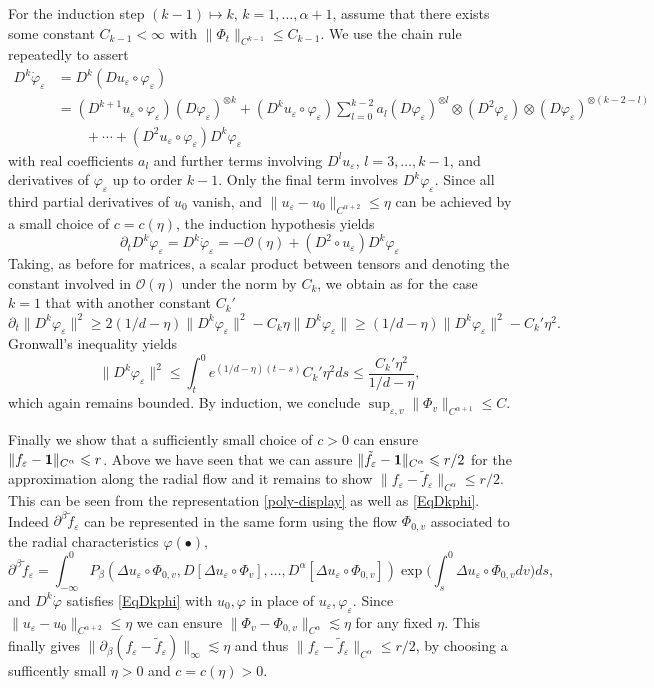 \documentclass{article}
\numberwithin{equation}{section}
\theoremstyle{definition}
\providecommand{\eps}{\varepsilon}
\renewcommand{\phi}{\varphi}
\renewcommand{\cdot}{{\scriptstyle \bullet} }
\providecommand{\norm}[1]{\lVert #1 \rVert}
\renewcommand{\le}{\leqslant}
\renewcommand{\ge}{\geqslant}
\begin{document}
For the induction step $(k-1)\mapsto k$, $k=1,\ldots,\alpha+1$, assume that there exists some constant $C_{k-1}<\infty$ with $\|\Phi_t\|_{C^{k-1}} \le C_{k-1}$. We use the chain rule repeatedly to assert
\begin{equation} \label{EqDkphi}
    \begin{split}
        D^k \dot \phi_\eps &= D^k( Du_\eps\circ \phi_\eps)\\
        & = (D^{k+1} u_\eps \circ \phi_\eps)( D\phi_\eps)^{\otimes k} + (D^{k} u_\eps \circ \phi_\eps)\sum_{l=0}^{k-2}a_l( D\phi_\eps)^{\otimes l} \otimes (D^2\phi_\eps ) \otimes (D\phi_\eps)^{\otimes (k-2-l)}\\
        &\qquad + \cdots + ( D^2u_\eps\circ \phi_\eps) D^k\phi_\eps
    \end{split}
\end{equation}
with real coefficients $a_l$ and further terms involving $D^lu_\eps$, $l=3,\ldots,k-1$, and  derivatives of $\phi_\eps$ up to order $k-1$.
Only the final term involves $D^k\phi_\eps$.  Since all third partial derivatives of $u_0$ vanish, and $\|u_\eps -u_0 \|_{C^{\alpha+2 }}\le\eta$ can be achieved by a small choice of $c=c(\eta)$, the induction hypothesis yields 
\[ \partial_t D^k \phi_\eps = D^k \dot \phi_\eps = - {\mathcal O}(\eta) + (D^2\circ u_\eps)D^k\phi_\eps\]
Taking, as before for matrices, a scalar product between tensors and denoting the constant involved in ${\mathcal O}(\eta)$ under the norm by $C_k$, we obtain as for the case $k=1$ that with another constant $C_k'$ 
\[\partial_t \|D^k \phi_\eps\|^2 \ge 2(1/d-\eta) \| D^k\phi_\eps \|^2 - C_k\eta \| D^k\phi_\eps \| \ge (1/d-\eta) \| D^k\phi_\eps \|^2 - C_k'\eta ^2. \]
Gronwall's inequality yields 
\[ \|D^k\phi_\eps \|^2\le \int_t^0 e^{(1/d-\eta)(t-s)} C_k'\eta^2  ds \le \frac{C_k'\eta^2 }{1/d-\eta}, \]
which again remains bounded. By induction, we conclude  $\sup_{\eps,v}\|\Phi_v\|_{C^{\alpha+1}}\le C$.




Finally we show that a sufficiently small choice of $c>0$ can ensure  $ \norm{f_\eps-{\bf 1}}_{C^\alpha}\le r$. Above we have seen that we can assure $\norm{\tilde f_\eps-{\bf 1}}_{C^\alpha}\le r/2$ for the approximation along the radial flow and it remains to show $\norm{f_\eps-\tilde f_\eps}_{C^\alpha}\le r/2$. This can be seen from the representation \eqref{poly-display} as well as \eqref{EqDkphi}. Indeed $\partial^\beta\tilde f_\eps$ can be represented in the same form using the flow  $\Phi_{0,v}$ associated to the radial characteristics $\varphi(\cdot)$,
\[\partial^\beta  \tilde f_\eps = \int_{-\infty}^0 P_\beta(\Delta u_\eps \circ \Phi_{0,v}, D [ \Delta u_\eps\circ \Phi_v ],\dots,  D^\alpha [\Delta u_\eps \circ \Phi_{0,v}])\exp\Big(\int_s^0 \Delta u_\eps\circ \Phi_{0,v}  dv\Big ) ds,\]
and $D^k\dot\varphi$ satisfies \eqref{EqDkphi} with $u_0,\varphi$ in place of $u_\eps,\phi_\eps$. Since $\norm{u_\eps-u_0}_{C^{\alpha+2}}\le\eta$ we can ensure $\norm{\Phi_v-\Phi_{0,v}}_{C^\alpha} \lesssim \eta$ for any fixed $\eta$. This finally gives $\norm{\partial_\beta(f_\eps-\tilde f_\eps)}_\infty\lesssim \eta$ and thus $\norm{f_\eps-\tilde f_\eps}_{C^\alpha}\le r/2$, by choosing a sufficently small $\eta>0$ and $c=c(\eta)>0$.
\end{document}
